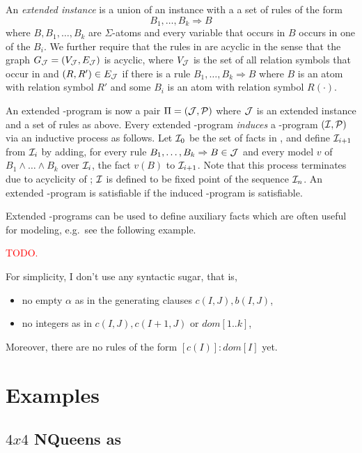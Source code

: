 \documentclass[conference]{IEEEtran}
\begin{document}
An \emph{extended instance \Jmc} is a union of an instance \Imc with a
a set of rules of the form
%
\[B_1,\ldots,B_k\Rightarrow B\]
%
where $B,B_1,\ldots,B_k$ are $\Sigma$-atoms and every variable that
occurs in $B$ occurs in one of the $B_i$. We further require that the
rules in \Jmc are acyclic in the sense that the graph $G_\mathcal{J} = (V_\mathcal{J},E_\mathcal{J})$ is
acyclic, where $V_\mathcal{J}$ is the set of all relation symbols that occur in
\Jmc and $(R,R')\in E_\mathcal{J}$ if there is a rule
$B_1,\ldots,B_k\Rightarrow B$ where $B$ is an atom with relation
symbol $R'$ and some $B_i$ is an atom with relation symbol $R(\cdot)$.  

An extended \bcore-program is now a pair $\Pi=(\mathcal{J},\mathcal{P})$ where
$\mathcal{J}$ is an extended instance and \Pmc a set of rules as above. Every
extended \bcore-program \emph{induces} a \bcore-program $(\mathcal{I},\mathcal{P})$
via an inductive process as follows. Let $\mathcal{I}_0$ be the set of facts
in \Jmc, and define $\mathcal{I}_{i+1}$ from $\mathcal{I}_i$ by adding, for every
rule $B_1,\ldots,B_k\Rightarrow B\in \mathcal{J}$ and every model $v$ of
$B_1\wedge \ldots \wedge B_k$ over $\mathcal{I}_i$, the fact $v(B)$ to
$\mathcal{I}_{i+1}$. Note that this process terminates due to acyclicity of
\Jmc; $\mathcal{I}$ is defined to be fixed point of the sequence $\mathcal{I}_n$. An
extended \bcore-program is satisfiable if the induced \bcore-program
is satisfiable. 

Extended \bcore-programs can be used to define auxiliary facts which
are often useful for modeling, e.g.~see the following example. 
%
\begin{example}
  \textcolor{red}{TODO.}
\end{example}


{\color{red}For simplicity, I don't use any syntactic sugar, that is,
%
\begin{itemize}

  \item no empty $\alpha$ as in the generating clauses
    $c(I,J),b(I,J)$,

  \item no integers as in $c(I,J),c(I+1,J)$ or $dom[1..k]$,


\end{itemize}
Moreover, there are no rules of the form $[c(I)]:dom[I]$ yet. 
}

\section{Examples}

\subsection{$4x4$ NQueens as \bflat}
\end{document}
